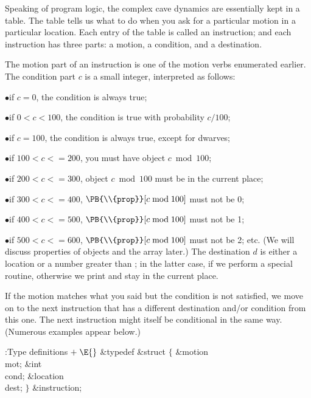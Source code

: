 Speaking of program logic, the complex cave dynamics are essentially
kept in a table. The table tells us what to do when you ask for a particular
motion in a particular location. Each entry of the table is called
an instruction; and each instruction has three parts: a motion,
a condition, and a destination.

The motion part of an instruction is one of the motion verbs enumerated
earlier. The condition part $c$ is a small integer, interpreted as follows:
\xdef\instspecs{\secno}

\smallskip
\item{$\bullet$}if $c=0$, the condition is always true;
\item{$\bullet$}if $0<c<100$, the condition is true with probability $c/100$;
\item{$\bullet$}if $c=100$, the condition is always true, except for dwarves;
\item{$\bullet$}if $100<c<=200$, you must have object $c\bmod100$;
\item{$\bullet$}if $200<c<=300$, object $c\bmod100$ must be in the current place;
\item{$\bullet$}if $300<c<=400$, $\PB{\\{prop}}[c\bmod100]$ must not be 0;
\item{$\bullet$}if $400<c<=500$, $\PB{\\{prop}}[c\bmod100]$ must not be 1;
\item{$\bullet$}if $500<c<=600$, $\PB{\\{prop}}[c\bmod100]$ must not be 2; etc.
\smallskip
\noindent (We will discuss properties of objects and the  array
later.) The destination $d$ is either a location or a number greater than
; in the latter case, if  we perform a special
routine, otherwise we print  and
stay in the current place.

If the motion matches what you said but the condition is not satisfied,
we move on to the next instruction that has a different destination and/or
condition from this one. The next instruction might itself be
conditional in the same way. (Numerous examples appear below.)

\Y\B\4:Type definitions\X${}\mathrel+\E{}$\6
\&{typedef} \&{struct} ${}\{{}$\1\6
\&{motion} \\{mot};\6
\&{int} \\{cond};\6
\&{location} \\{dest};\2\6
${}\}{}$ \&{instruction};\par
\fi

